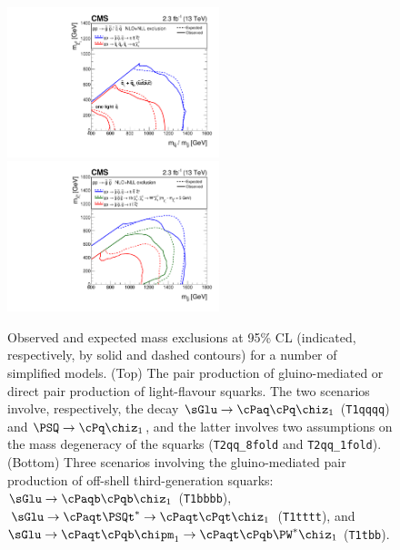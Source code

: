 \begin{figure}[!h]
  \begin{center}
    \includegraphics[width=0.55\textwidth]{figures/limits/v1/mixSUMMARY.pdf}
    \includegraphics[width=0.55\textwidth]{figures/limits/v1/gluinoSUMMARY.pdf} 
    \caption{Observed and expected mass exclusions at 95\% CL
      (indicated, respectively, by solid and dashed contours) for
      a number of simplified models. (Top) The pair production of
      gluino-mediated or direct pair production of light-flavour
      squarks. The two scenarios involve, respectively, the
      decay $\sGlu\ra\cPaq\cPq\chiz_1$ (\texttt{T1qqqq}) and
      $\PSQ\ra\cPq\chiz_1$, and the latter involves two assumptions on
      the mass degeneracy of the squarks (\texttt{T2qq\_8fold} and
      \texttt{T2qq\_1fold}). (Bottom) Three scenarios involving the
      gluino-mediated pair production of off-shell third-generation
      squarks: $\sGlu\ra\cPaqb\cPqb\chiz_1$ (\texttt{T1bbbb}),
      $\sGlu\ra\cPaqt\PSQt^*\ra\cPaqt\cPqt\chiz_1$ (\texttt{T1tttt}),
      and $\sGlu\ra\cPaqt\cPqb\chipm_1\ra\cPaqt\cPqb\PW^*\chiz_1$
      (\texttt{T1tbb}). 
}
    \label{fig:limits-sms-1} 
    \vspace{1.0cm} %
  \end{center}
\end{figure}


